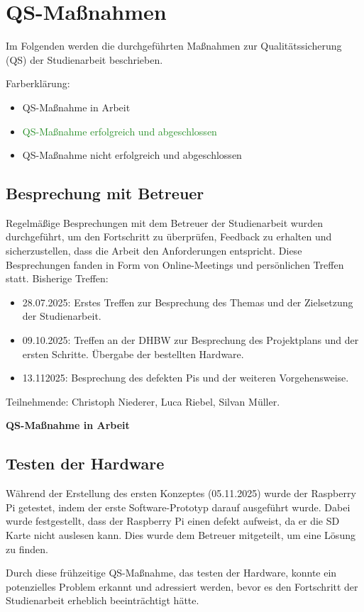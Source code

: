 \chapter{QS-Maßnahmen}
Im Folgenden werden die durchgeführten Maßnahmen zur Qualitätssicherung (QS) der Studienarbeit beschrieben.

Farberklärung:
\begin{itemize}
    \item {\textcolor{yellow!80!brown}{QS-Maßnahme in Arbeit}}
    \item {\textcolor{ForestGreen}{QS-Maßnahme erfolgreich und abgeschlossen}}
    \item {\textcolor{red!80!black}{QS-Maßnahme nicht erfolgreich und abgeschlossen}}
\end{itemize}
\section{Besprechung mit Betreuer}
Regelmäßige Besprechungen mit dem Betreuer der Studienarbeit wurden durchgeführt, um den Fortschritt zu überprüfen, Feedback zu erhalten und sicherzustellen, dass die Arbeit den Anforderungen entspricht. Diese Besprechungen fanden in Form von Online-Meetings und persönlichen Treffen statt.
Bisherige Treffen: 
\begin{itemize}
    \item 28.07.2025: Erstes Treffen zur Besprechung des Themas und der Zielsetzung der Studienarbeit.
    \item 09.10.2025: Treffen an der DHBW zur Besprechung des Projektplans und der ersten Schritte. Übergabe der bestellten Hardware.
    \item 13.112025: Besprechung des defekten Pis und der weiteren Vorgehensweise.
\end{itemize}
Teilnehmende: Christoph Niederer, Luca Riebel, Silvan Müller.

\textcolor{yellow!80!brown}{\textbf{QS-Maßnahme in Arbeit}}
\section{Testen der Hardware}
Während der Erstellung des ersten Konzeptes (05.11.2025) wurde der Raspberry Pi getestet, indem der erste Software-Prototyp darauf ausgeführt wurde. Dabei wurde festgestellt, dass der Raspberry Pi einen defekt aufweist, da er die SD Karte nicht auslesen kann. Dies wurde dem Betreuer mitgeteilt, um eine Lösung zu finden.

Durch diese frühzeitige QS-Maßnahme, das testen der Hardware, konnte ein potenzielles Problem erkannt und adressiert werden, bevor es den Fortschritt der Studienarbeit erheblich beeinträchtigt hätte.


